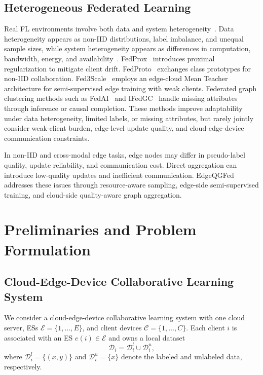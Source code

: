 ﻿\documentclass[10pt, conference, letterpaper]{ IEEEtran}
\begin{document}
\subsection{Heterogeneous Federated Learning}
Real FL environments involve both data and system heterogeneity~\cite{Lin2026HASFL}. Data heterogeneity appears as non-IID distributions, label imbalance, and unequal sample sizes, while system heterogeneity appears as differences in computation, bandwidth, energy, and availability~\cite{lu2024federated, wang2025fed3scale, Chen_2026_CVPR}. FedProx~\cite{li2020federated} introduces proximal regularization to mitigate client drift. FedProto~\cite{tan2022fedproto} exchanges class prototypes for non-IID collaboration. Fed3Scale~\cite{wang2025fed3scale} employs an edge-cloud Mean Teacher architecture for semi-supervised edge training with weak clients. Federated graph clustering methods such as FedAI~\cite{han2026federated} and IFedGC~\cite{liu2026causally} handle missing attributes through inference or causal completion. These methods improve adaptability under data heterogeneity, limited labels, or missing attributes, but rarely jointly consider weak-client burden, edge-level update quality, and cloud-edge-device communication constraints.

In non-IID and cross-modal edge tasks, edge nodes may differ in pseudo-label quality, update reliability, and communication cost. Direct aggregation can introduce low-quality updates and inefficient communication. EdgeQGFed addresses these issues through resource-aware sampling, edge-side semi-supervised training, and cloud-side quality-aware graph aggregation.

\section{Preliminaries and Problem Formulation}
\label{section3}
\subsection{Cloud-Edge-Device Collaborative Learning System}
\label{section3.1}
We consider a cloud-edge-device collaborative learning system with one cloud server, ESs $\mathcal{E}=\{1,\ldots,E\}$, and client devices $\mathcal{C}=\{1,\ldots,C\}$. Each client $i$ is associated with an ES $e(i)\in\mathcal{E}$ and owns a local dataset
\begin{equation}
    \mathcal{D}_i=\mathcal{D}_i^l\cup\mathcal{D}_i^u,
\end{equation}
where $\mathcal{D}_i^l=\{(x,y)\}$ and $\mathcal{D}_i^u=\{x\}$ denote the labeled and unlabeled data, respectively.
\end{document}
